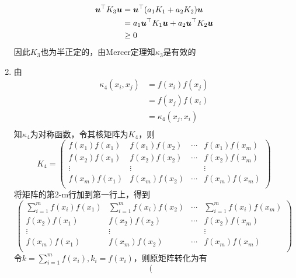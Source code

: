 \documentclass[answers]{exam}  %
\begin{document}
\begin{questions}
\begin{solution}
\begin{enumerate}
\[\begin{aligned}
                    \boldsymbol{u}^\top K_3\boldsymbol{u}
                    &=\boldsymbol{u}^\top (a_1K_1+a_2K_2)\boldsymbol{u}\\
                    &=a_1\boldsymbol{u}^\top K_1\boldsymbol{u}+a_2\boldsymbol{u}^\top K_2\boldsymbol{u}\\
                    &\ge0
                \end{aligned}  
            \]
            因此$K_3$也为半正定的，由Mercer定理知$\kappa_3$是有效的
            \item 由
            \[
                \begin{aligned}
                    \kappa_4(x_i,x_j)&=f(x_i)f(x_j)\\
                    &=f(x_j)f(x_i)\\
                    &=\kappa_4(x_j,x_i)\\
                \end{aligned}  
            \]
            知$\kappa_4$为对称函数，令其核矩阵为$K_4$，则
            \[ 
                K_4=
                \left(
                    \begin{matrix}
                        f(x_1)f(x_1) & f(x_1)f(x_2) & \cdots & f(x_1)f(x_m)\\
                        f(x_2)f(x_1) & f(x_2)f(x_2) & \cdots & f(x_2)f(x_m)\\
                        \vdots       &  \vdots      & & \vdots\\
                        f(x_m)f(x_1) & f(x_m)f(x_2) & \cdots & f(x_m)f(x_m)\\
                    \end{matrix}
                \right)
            \]
            将矩阵的第2-m行加到第一行上，得到
            \[ 
                \left(
                    \begin{matrix}
                        \sum^m_{i=1}f(x_i)f(x_1) & \sum^m_{i=1}f(x_i)f(x_2) & \cdots & \sum^m_{i=1}f(x_i)f(x_m)\\
                        f(x_2)f(x_1) & f(x_2)f(x_2) & \cdots & f(x_2)f(x_m)\\
                        \vdots       &  \vdots      & & \vdots\\
                        f(x_m)f(x_1) & f(x_m)f(x_2) & \cdots & f(x_m)f(x_m)\\
                    \end{matrix}
                \right)
            \]
            令$k=\sum^m_{i=1}f(x_i),k_i=f(x_i)$，则原矩阵转化为有
            \[ 
                \left(
                    \begin{matrix}

\end{matrix}\]
\end{enumerate}
\end{solution}
\end{questions}
\end{document}
